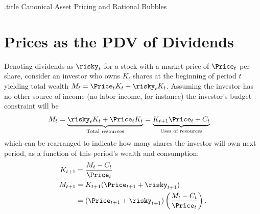 \documentclass{handout}
\begin{document}
\handoutHeader

\begin{verbatimwrite}{\jobname.title}
Canonical Asset Pricing and Rational Bubbles
\end{verbatimwrite}

\handoutNameMake



\section{Prices as the PDV of Dividends}
Denoting dividends as $\risky_{t}$ for a stock with a market price 
of $\Price_{t}$ per share, consider an 
investor who owns $K_{t}$ shares at the beginning of period $t$ 
yielding total wealth $M_{t}=\Price_{t}K_{t}+\risky_{t}K_{t}$.  Assuming the 
investor has no other source of income (no labor income, for instance) 
the investor's budget constraint will be
\begin{equation}\begin{gathered}\begin{aligned}
        M_{t}=\underbrace{\risky_{t}K_{t}+\Price_{t}K_{t}}_{\text{Total resources}} & =  \underbrace{K_{t+1}\Price_{t}+C_{t}}_{\text{Uses of resources}}
\end{aligned}\end{gathered}\end{equation}
which can be rearranged to indicate how many shares the investor will
own next period, as a function of this period's wealth and consumption:
\begin{equation}\begin{gathered}\begin{aligned}        
    K_{t+1} & =  \frac{M_{t}-C_{t}}{\Price_{t}}
\\  M_{t+1} & =  K_{t+1}(\Price_{t+1}+\risky_{t+1})
\\          & =  (\Price_{t+1}+\risky_{t+1})\left(\frac{M_{t}-C_{t}}{\Price_{t}}\right)
.
\end{aligned}\end{gathered}\end{equation}
\end{document}
